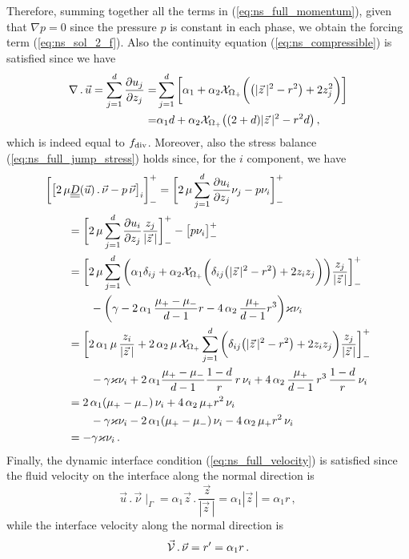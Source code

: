 Therefore, summing together all the terms in (\ref{eq:ns_full_momentum}),
given that $\nabla p = 0$  since the pressure $p$ is constant in each
phase, we obtain the forcing term (\ref{eq:ns_sol_2_f}). Also the
continuity equation (\ref{eq:ns_compressible}) is satisfied since we have
\begin{align*}
\nabla\,.\,\vec u=\sum_{j=1}^d\frac{\partial u_j}{\partial z_j} = &
\sum_{j=1}^d\bigg[ \alpha_1
+ \alpha_2\mathrm{\mathcal{X}}_{\Omega_+}\bigg(\big(|\vec z\,|^2-r^2\big)
+ 2z_j^2\bigg)\bigg]\\
= & \alpha_1d + \alpha_2\mathrm{\mathcal{X}}_{\Omega_+}\big((2+d)|\vec z\,|^2-r^2d\big)\,,
\end{align*}
which is indeed equal to $f_{\rm{div}}$. Moreover, also the stress balance
(\ref{eq:ns_full_jump_stress}) holds since, for the
$i$ component, we have
\begin{align*}
& \bigg[\big[2\,\mu \mat D(\vec u)\,.\,\vec\nu - p\,\vec \nu\big]_i\bigg]_-^+ =
\bigg[2\,\mu \sum_{j=1}^d\frac{\partial u_i}{\partial z_j}\nu_j
- p\nu_i\bigg]_-^+ \\ & \qquad
= \bigg[2\,\mu\sum_{j=1}^d\frac{\partial u_i}{\partial z_j}
\frac{z_j}{|\vec z\,|}\bigg]_-^+ -\big[ p\nu_i\big]_-^+ \\
& \qquad = \bigg[2\,\mu\sum_{j=1}^d
\bigg(\alpha_1 \delta_{ij}
+ \alpha_2\charfcn{\Omega_+}\bigg(\delta_{ij}\big(|\vec z\,|^2-r^2\big)
+ 2z_iz_j\bigg)\bigg)\frac{z_j}{|\vec z\,|}\bigg]_-^+ \\
& \qquad \qquad
- \bigg(\gamma - 2\,\alpha_1\,\frac{\mu_+ - \mu_-}
{d-1}r- 4\,\alpha_2\,\frac{\mu_+}{d-1}r^3\bigg) \varkappa\nu_i \\
& \qquad = \bigg[ 2\,\alpha_1\,\mu\,\frac{z_i}{|\vec z\,|}
+ 2\,\alpha_2\,\mu\,\charfcn{\Omega_+}\sum_{j=1}^d
\bigg(\delta_{ij}\big(|\vec z\,|^2-r^2\big)
+ 2z_iz_j\bigg)\frac{z_j}{|\vec z\,|}\bigg]_-^+ \\
& \qquad \qquad -\gamma \varkappa \nu_i
+2\,\alpha_1\frac{\mu_+-\mu_-}{d-1}\frac{1-d}{r}\,r\,\nu_i
+ 4\,\alpha_2\,\frac{\mu_+}{d-1}\,r^3\,\frac{1-d}{r}\,\nu_i\\
& \qquad =  2\,\alpha_1(\mu_+-\mu_-)\,\nu_i +4\,\alpha_2\,\mu_+r^2\,\nu_i
\\ & \qquad \qquad
-\gamma \varkappa \nu_i - 2\,\alpha_1(\mu_+-\mu_-)\,\nu_i
- 4\,\alpha_2\,\mu_+ r^2\,\nu_i \\
& \qquad = -\gamma \varkappa \nu_i\,.
\end{align*}
Finally, the dynamic interface condition (\ref{eq:ns_full_velocity}) is
satisfied since the fluid velocity on the interface along the normal direction
is
\begin{equation*}
\vec u\,.\,\vec \nu \!\mid_\Gamma=\alpha_1\vec z\,.\, \frac{\vec z}{|\vec z\,|}
= \alpha_1|\vec z\,|=\alpha_1 r\,,
\end{equation*}
while the interface velocity along the normal direction is
\begin{equation*}
\vec{\mathcal{V}}\,.\,\vec \nu=r^\prime=\alpha_1 r\,.
\end{equation*}

